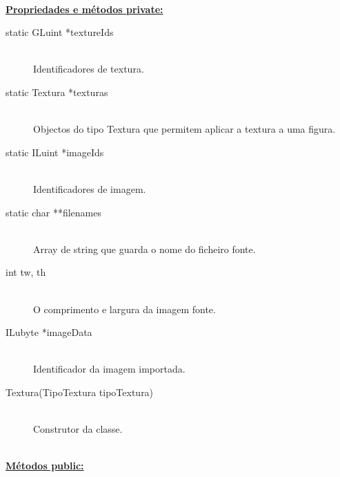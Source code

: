 \documentclass[a5paper,onecolumn, 11pt]{article}
\begin{document}
\hfill \\ \underline{\textbf{Propriedades e métodos private:}}

\begin{description}
	\item[static GLuint *textureIds] \hfill \\
	Identificadores de textura.

	\item[static Textura *texturas] \hfill \\
	Objectos do tipo Textura que permitem aplicar a textura a uma figura.

	\item[static ILuint *imageIds] \hfill \\
	Identificadores de imagem.

	\item[static char **filenames] \hfill \\
	Array de string que guarda o nome do ficheiro fonte.

	\item[int tw, th] \hfill \\
	O comprimento e largura da imagem fonte.

	\item[ILubyte *imageData] \hfill \\
	Identificador da imagem importada.

	\item[Textura(TipoTextura tipoTextura)] \hfill \\
	Construtor da classe.
\end{description}

\hfill \\ \underline{\textbf{Métodos public:}}
\end{document}
